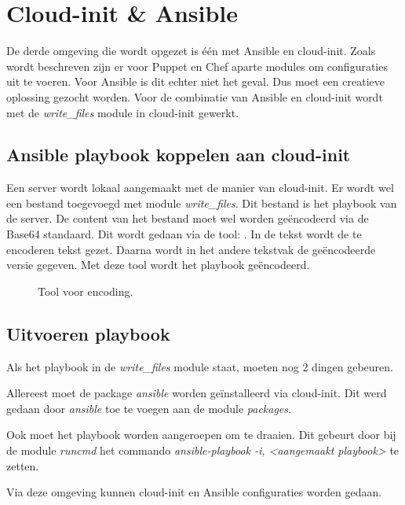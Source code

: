 \section{Cloud-init \& Ansible }
De derde omgeving die wordt opgezet is één met Ansible en cloud-init. Zoals wordt beschreven zijn er voor Puppet en Chef aparte modules om configuraties uit te voeren. Voor Ansible is dit echter niet het geval. Dus moet een creatieve oplossing gezocht worden. Voor de combinatie van Ansible en cloud-init wordt met de \textit{write\_files} module in cloud-init gewerkt. 

\subsection{Ansible playbook koppelen aan cloud-init}
Een server wordt lokaal aangemaakt met de manier van cloud-init. Er wordt wel een bestand toegevoegd met module \textit{write\_files}. Dit bestand is het playbook van de server. De content van het bestand moet wel worden geëncodeerd via de Base64 standaard. Dit wordt gedaan via de tool: \autocite{toolbas64}. In de tekst wordt de te encoderen tekst gezet. Daarna wordt in het andere tekstvak de geëncodeerde versie gegeven. Met deze tool wordt het playbook geëncodeerd.
\begin{figure}[!htb]
	\caption{Tool voor encoding.}
	\label{fig:base64}
\end{figure}

\newpage
\subsection{Uitvoeren playbook}
Als het playbook in de \textit{write\_files} module staat, moeten nog 2 dingen gebeuren. 

Allereest moet de package \textit{ansible} worden geïnstalleerd via cloud-init. Dit werd gedaan door \textit{ansible} toe te voegen aan de module \textit{packages}. 

Ook moet het playbook worden aangeroepen om te draaien. Dit gebeurt door bij de module \textit{runcmd} het commando \textit{ansible-playbook -i, <aangemaakt playbook>} te zetten.

Via deze omgeving kunnen cloud-init en Ansible configuraties worden gedaan.



